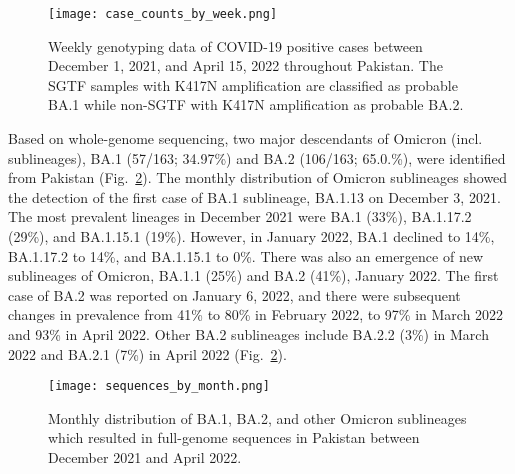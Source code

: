 \begin{figure}[ht]
   \centering
   \texttt{[image: case\_counts\_by\_week.png]}
    \caption{Weekly genotyping data of COVID-19 positive cases between December 1, 2021, and April 15, 2022 throughout Pakistan. The SGTF samples with K417N amplification are classified as probable BA.1 while non-SGTF with K417N amplification as probable BA.2.}
    \label{fig:genotyped}
\end{figure}

Based on whole-genome sequencing, two major descendants of Omicron (incl. sublineages), BA.1 (57/163; 34.97\%) and BA.2 (106/163; 65.0.\%), were identified from Pakistan (Fig.~\ref{fig:sublineages}).
The monthly distribution of Omicron sublineages showed the detection of the first case of BA.1 sublineage, BA.1.13 on December 3, 2021.
The most prevalent lineages in December 2021 were BA.1 (33\%), BA.1.17.2 (29\%), and BA.1.15.1 (19\%).
However, in January 2022, BA.1 declined to 14\%, BA.1.17.2 to 14\%, and BA.1.15.1 to 0\%.
There was also an emergence of new sublineages of Omicron, BA.1.1 (25\%) and BA.2 (41\%), January 2022.
The first case of BA.2 was reported on January 6, 2022, and there were subsequent changes in prevalence from 41\% to 80\% in February 2022, to 97\% in March 2022 and 93\% in April 2022.
Other BA.2 sublineages include BA.2.2 (3\%) in March 2022 and BA.2.1 (7\%) in April 2022 (Fig.~\ref{fig:sublineages}).

\begin{figure}[ht]
   \centering
   \texttt{[image: sequences\_by\_month.png]}
    \caption{Monthly distribution of BA.1, BA.2, and other Omicron sublineages which resulted in full-genome sequences in Pakistan between December 2021 and April 2022.}
    \label{fig:sublineages}
\end{figure}


